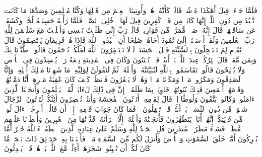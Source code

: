 \startbuffer[\q:27:42]
فَلَمَّا جَاۤءَتۡ قِیلَ أَهَٰكَذَا عَرۡشُكِۖ قَالَتۡ كَأَنَّهُۥ هُوَۚ وَأُوتِینَا ٱلۡعِلۡمَ مِن قَبۡلِهَا وَكُنَّا مُسۡلِمِینَ%
\stopbuffer
\startbuffer[\q:27:43]
وَصَدَّهَا مَا كَانَت تَّعۡبُدُ مِن دُونِ ٱللَّهِۖ إِنَّهَا كَانَتۡ مِن قَوۡمࣲ كَٰفِرِینَ%
\stopbuffer
\startbuffer[\q:27:44]
قِیلَ لَهَا ٱدۡخُلِی ٱلصَّرۡحَۖ فَلَمَّا رَأَتۡهُ حَسِبَتۡهُ لُجَّةࣰ وَكَشَفَتۡ عَن سَاقَیۡهَاۚ قَالَ إِنَّهُۥ صَرۡحࣱ مُّمَرَّدࣱ مِّن قَوَارِیرَۗ قَالَتۡ رَبِّ إِنِّی ظَلَمۡتُ نَفۡسِی وَأَسۡلَمۡتُ مَعَ سُلَیۡمَٰنَ لِلَّهِ رَبِّ ٱلۡعَٰلَمِینَ%
\stopbuffer
\startbuffer[\q:27:45]
وَلَقَدۡ أَرۡسَلۡنَاۤ إِلَىٰ ثَمُودَ أَخَاهُمۡ صَٰلِحًا أَنِ ٱعۡبُدُوا۟ ٱللَّهَ فَإِذَا هُمۡ فَرِیقَانِ یَخۡتَصِمُونَ%
\stopbuffer
\startbuffer[\q:27:46]
قَالَ یَٰقَوۡمِ لِمَ تَسۡتَعۡجِلُونَ بِٱلسَّیِّئَةِ قَبۡلَ ٱلۡحَسَنَةِۖ لَوۡلَا تَسۡتَغۡفِرُونَ ٱللَّهَ لَعَلَّكُمۡ تُرۡحَمُونَ%
\stopbuffer
\startbuffer[\q:27:47]
قَالُوا۟ ٱطَّیَّرۡنَا بِكَ وَبِمَن مَّعَكَۚ قَالَ طَٰۤئِرُكُمۡ عِندَ ٱللَّهِۖ بَلۡ أَنتُمۡ قَوۡمࣱ تُفۡتَنُونَ%
\stopbuffer
\startbuffer[\q:27:48]
وَكَانَ فِی ٱلۡمَدِینَةِ تِسۡعَةُ رَهۡطࣲ یُفۡسِدُونَ فِی ٱلۡأَرۡضِ وَلَا یُصۡلِحُونَ%
\stopbuffer
\startbuffer[\q:27:49]
قَالُوا۟ تَقَاسَمُوا۟ بِٱللَّهِ لَنُبَیِّتَنَّهُۥ وَأَهۡلَهُۥ ثُمَّ لَنَقُولَنَّ لِوَلِیِّهِۦ مَا شَهِدۡنَا مَهۡلِكَ أَهۡلِهِۦ وَإِنَّا لَصَٰدِقُونَ%
\stopbuffer
\startbuffer[\q:27:50]
وَمَكَرُوا۟ مَكۡرࣰا وَمَكَرۡنَا مَكۡرࣰا وَهُمۡ لَا یَشۡعُرُونَ%
\stopbuffer
\startbuffer[\q:27:51]
فَٱنظُرۡ كَیۡفَ كَانَ عَٰقِبَةُ مَكۡرِهِمۡ أَنَّا دَمَّرۡنَٰهُمۡ وَقَوۡمَهُمۡ أَجۡمَعِینَ%
\stopbuffer
\startbuffer[\q:27:52]
فَتِلۡكَ بُیُوتُهُمۡ خَاوِیَةَۢ بِمَا ظَلَمُوۤا۟ۚ إِنَّ فِی ذَٰلِكَ لَءَایَةࣰ لِّقَوۡمࣲ یَعۡلَمُونَ%
\stopbuffer
\startbuffer[\q:27:53]
وَأَنجَیۡنَا ٱلَّذِینَ ءَامَنُوا۟ وَكَانُوا۟ یَتَّقُونَ%
\stopbuffer
\startbuffer[\q:27:54]
وَلُوطًا إِذۡ قَالَ لِقَوۡمِهِۦۤ أَتَأۡتُونَ ٱلۡفَٰحِشَةَ وَأَنتُمۡ تُبۡصِرُونَ%
\stopbuffer
\startbuffer[\q:27:55]
أَئِنَّكُمۡ لَتَأۡتُونَ ٱلرِّجَالَ شَهۡوَةࣰ مِّن دُونِ ٱلنِّسَاۤءِۚ بَلۡ أَنتُمۡ قَوۡمࣱ تَجۡهَلُونَ%
\stopbuffer
\startbuffer[\q:27:56]
۞ فَمَا كَانَ جَوَابَ قَوۡمِهِۦۤ إِلَّاۤ أَن قَالُوۤا۟ أَخۡرِجُوۤا۟ ءَالَ لُوطࣲ مِّن قَرۡیَتِكُمۡۖ إِنَّهُمۡ أُنَاسࣱ یَتَطَهَّرُونَ%
\stopbuffer
\startbuffer[\q:27:57]
فَأَنجَیۡنَٰهُ وَأَهۡلَهُۥۤ إِلَّا ٱمۡرَأَتَهُۥ قَدَّرۡنَٰهَا مِنَ ٱلۡغَٰبِرِینَ%
\stopbuffer
\startbuffer[\q:27:58]
وَأَمۡطَرۡنَا عَلَیۡهِم مَّطَرࣰاۖ فَسَاۤءَ مَطَرُ ٱلۡمُنذَرِینَ%
\stopbuffer
\startbuffer[\q:27:59]
قُلِ ٱلۡحَمۡدُ لِلَّهِ وَسَلَٰمٌ عَلَىٰ عِبَادِهِ ٱلَّذِینَ ٱصۡطَفَىٰۤۗ ءَاۤللَّهُ خَیۡرٌ أَمَّا یُشۡرِكُونَ%
\stopbuffer
\startbuffer[\q:27:60]
أَمَّنۡ خَلَقَ ٱلسَّمَٰوَٰتِ وَٱلۡأَرۡضَ وَأَنزَلَ لَكُم مِّنَ ٱلسَّمَاۤءِ مَاۤءࣰ فَأَنۢبَتۡنَا بِهِۦ حَدَاۤئِقَ ذَاتَ بَهۡجَةࣲ مَّا كَانَ لَكُمۡ أَن تُنۢبِتُوا۟ شَجَرَهَاۤۗ أَءِلَٰهࣱ مَّعَ ٱللَّهِۚ بَلۡ هُمۡ قَوۡمࣱ یَعۡدِلُونَ%
